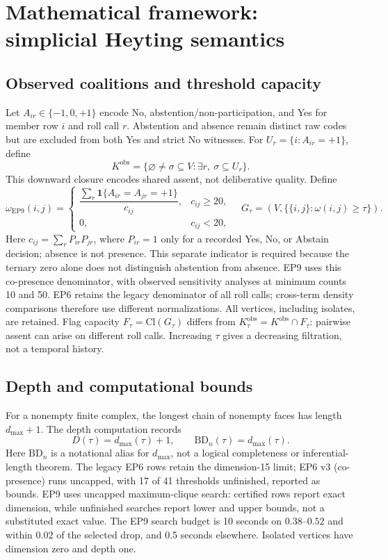 \documentclass[a4paper,fleqn,oneside]{cas-sc}
\theoremstyle{definition}
\theoremstyle{plain}
\begin{document}
\section{Mathematical framework: simplicial Heyting semantics}\label{sec:framework}
\subsection{Observed coalitions and threshold capacity}
Let $A_{ir}\in\{-1,0,+1\}$ encode No, abstention/non-participation, and Yes for member row $i$ and roll call $r$. Abstention and absence remain distinct raw codes but are excluded from both Yes and strict No witnesses. For $U_r=\{i:A_{ir}=+1\}$, define
\begin{equation}
K^{\mathrm{obs}}=\{\varnothing\ne\sigma\subseteq V:\exists r,\ \sigma\subseteq U_r\}.
\end{equation}
This downward closure encodes shared assent, not deliberative quality. Define
\begin{equation}
\omega_{\mathrm{EP9}}(i,j)=\begin{cases}\dfrac{\sum_r\mathbf1\{A_{ir}=A_{jr}=+1\}}{c_{ij}},&c_{ij}\geq20,\\0,&c_{ij}<20,\end{cases}\quad
G_\tau=(V,\{\{i,j\}:\omega(i,j)\geq\tau\}).
\end{equation}
Here $c_{ij}=\sum_r P_{ir}P_{jr}$, where $P_{ir}=1$ only for a recorded Yes, No, or Abstain decision; absence is not presence. This separate indicator is required because the ternary zero alone does not distinguish abstention from absence. EP9 uses this co-presence denominator, with observed sensitivity analyses at minimum counts 10 and 50. EP6 retains the legacy denominator of all roll calls; cross-term density comparisons therefore use different normalizations. All vertices, including isolates, are retained. Flag capacity $F_\tau=\mathrm{Cl}(G_\tau)$ differs from $K^{\mathrm{obs}}_\tau=K^{\mathrm{obs}}\cap F_\tau$: pairwise assent can arise on different roll calls. Increasing $\tau$ gives a decreasing filtration, not a temporal history.
\subsection{Depth and computational bounds}
For a nonempty finite complex, the longest chain of nonempty faces has length $d_{\max}+1$. The depth computation records
\begin{equation}
D(\tau)=d_{\max}(\tau)+1,\qquad \mathrm{BD}_n(\tau)=d_{\max}(\tau).
\end{equation}
Here $\mathrm{BD}_n$ is a notational alias for $d_{\max}$, not a logical completeness or inferential-length theorem. The legacy EP6 rows retain the dimension-15 limit; EP6 v3 (co-presence) runs uncapped, with 17 of 41 thresholds unfinished, reported as bounds. EP9 uses uncapped maximum-clique search: certified rows report exact dimension, while unfinished searches report lower and upper bounds, not a substituted exact value. The EP9 search budget is 10 seconds on $0.38$--$0.52$ and within $0.02$ of the selected drop, and 0.5 seconds elsewhere. Isolated vertices have dimension zero and depth one.
\end{document}

